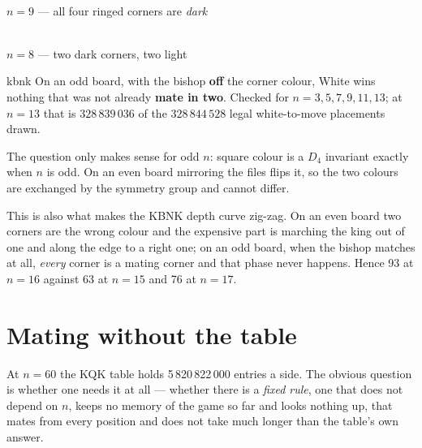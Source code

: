 \documentclass[11pt]{article}
\begin{document}
\begin{center}
\begin{minipage}{0.40\textwidth}\centering
  \\[1mm]
  {\small $n=9$ --- all four ringed corners are \emph{dark}}
\end{minipage}\hfill
\begin{minipage}{0.40\textwidth}\centering
  \\[1mm]
  {\small $n=8$ --- two dark corners, two light}
\end{minipage}
\end{center}

\begin{result}[title={A bishop on the wrong colour has no mating corner}]{kbnk}
On an odd board, with the bishop \textbf{off} the corner colour, White wins
nothing that was not already \textbf{mate in two}. Checked for
$n = 3, 5, 7, 9, 11, 13$; at $n=13$ that is $328\,839\,036$ of the
$328\,844\,528$ legal white-to-move placements drawn.

\smallskip
The question only makes sense for odd $n$: square colour is a $D_4$ invariant
exactly when $n$ is odd. On an even board mirroring the files flips it, so the
two colours are exchanged by the symmetry group and cannot differ.
\end{result}

\noindent
This is also what makes the KBNK depth curve zig-zag. On an even board two
corners are the wrong colour and the expensive part is marching the king out of
one and along the edge to a right one; on an odd board, when the bishop matches
at all, \emph{every} corner is a mating corner and that phase never happens.
Hence 93 at $n=16$ against 63 at $n=15$ and 76 at $n=17$.

\clearpage
\section{Mating without the table}\label{sec:rule}

At $n=60$ the KQK table holds 5\,820\,822\,000 entries a side. The obvious
question is whether one needs it at all --- whether there is a \emph{fixed
rule}, one that does not depend on $n$, keeps no memory of the game so far and
looks nothing up, that mates from every position and does not take much longer
than the table's own answer.
\end{document}
